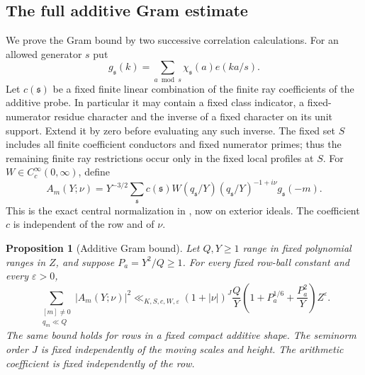 \documentclass[11pt,a4paper]{article}
\numberwithin{equation}{section}
\newtheorem{proposition}[theorem]{Proposition}
\theoremstyle{definition}
\theoremstyle{remark}
\newcommand{\eps}{\varepsilon}
\begin{document}
\subsection{The full additive Gram estimate}

We prove the Gram bound by two successive correlation calculations.  For an allowed generator $s$
put
\[
 g_{\mathfrak s}(k)=\sum_{a\bmod s}\chi_{\mathfrak s}(a)e(ka/s).
\]
Let $c(\mathfrak s)$ be a fixed finite linear combination of the finite
ray coefficients of the additive probe.  In particular it may contain
a fixed class indicator, a fixed-numerator residue character and the
inverse of a fixed character on its unit support.  Extend it by zero
before evaluating any such inverse.  The fixed set $S$ includes all
finite coefficient conductors and fixed numerator primes; thus the
remaining finite ray restrictions occur only in the fixed local
profiles at $S$.  For $W\in C_c^\infty(0,\infty)$,
define
\begin{equation}\label{eq:additive-polynomial}
 A_m(Y;\nu)=Y^{-3/2}\sum_{\mathfrak s}
 c(\mathfrak s)W(q_{\mathfrak s}/Y)
       (q_{\mathfrak s}/Y)^{-1+i\nu}g_{\mathfrak s}(-m).
\end{equation}
This is the exact central normalization in \cite[Section~6 and
Proposition~15.2]{Q}, now on exterior ideals.
The coefficient $c$ is independent of the row and of $\nu$.

\begin{proposition}[Additive Gram bound]\label{prop:additive-gram}
Let $Q,Y\ge1$ range in fixed polynomial ranges in $Z$, and suppose
$P_a=Y^2/Q\ge1$.  For every fixed row-ball constant and every $\eps>0$,
\begin{equation}\label{eq:additive-gram-bound}
 \sum_{\substack{[m]\ne0\\q_m\ll Q}}|A_m(Y;\nu)|^2
 \ll_{K,S,c,W,\eps}(1+|\nu|)^J\frac QY
             \left(1+P_a^{1/6}+\frac{P_a^2}{Y}\right)Z^\eps.
\end{equation}
The same bound holds for rows in a fixed compact additive shape.  The
seminorm order $J$ is fixed independently of the moving scales and
height.  The arithmetic coefficient is fixed independently of the row.
\end{proposition}
\end{document}
